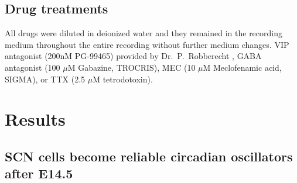 \subsection*{Drug treatments} 
All drugs were diluted in deionized water and they remained in the recording medium throughout the entire recording without further medium changes.
VIP antagonist (200nM PG-99465) provided by Dr.\ P.\ Robberecht \cite{Cutler2003}, GABA antagonist (100 $\mu$M Gabazine, TROCRIS), MEC (10 $\mu$M Meclofenamic acid, SIGMA), or TTX (2.5 $\mu$M tetrodotoxin).


\section{Results}

\subsection*{SCN cells become reliable circadian oscillators after E14.5}
